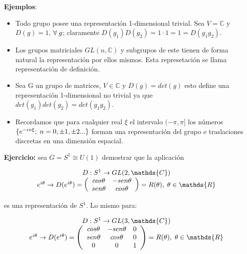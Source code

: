 \documentclass{article}
\begin{document}
\textbf{Ejemplos}:

\begin{itemize}
    \item Todo grupo posee una representación 1-dimensional trivial. Sea $V=\mathds{C}$ y $D(g)=1$, $\forall \hspace{0.1cm} g$; claramente $D(g_1)D(g_2)=1\cdot 1=1=D(g_1g_2)$.
    \item Los grupos matriciales $GL(n,\mathds{C})$ y subgrupos de este tienen de forma natural la representación por ellos mismos. Esta represetación se llama representación de definición.
    \item Sea G un grupo de matrices, $V\in \mathds{C}$ y $D(g)=det(g)$ esto define una representación 1-dimensional no trivial ya que $det(g_1)det(g_2)=det(g_1g_2)$.
    \item Recordamos que para cualquier real $\xi$ el intervalo $(-\pi, \pi]$ los números $\lbrace e^{-in\xi}; \hspace{0.1cm} n=0,\pm 1, \pm 2... \rbrace$ forman una representación del grupo e traslaciones discretas en una dimensión espacial.
\end{itemize}

 \smallskip
    \textbf{Ejercicio:} sea $G=S^1 \cong U(1)$ demostrar que la aplicación

    $$\begin{array}{cc}
         D: S^1 \to GL(2,\mathds{C})  \\
         e^{i\theta} \to D(e^{i\theta})= \left (\begin{array}{cc}
           cos \theta   & -sen \theta  \\
           sen \theta   & cos \theta
         \end{array} \right )=R( \theta), \hspace{0.1cm} \theta \in \mathds{R}
    \end{array}$$

    es una representación de $S^1$. Lo mismo para:

     $$\begin{array}{cc}
         D: S^1 \to GL(3,\mathds{C})  \\
         e^{i\theta} \to D(e^{i\theta})= \left (\begin{array}{ccc}
           cos \theta   & -sen \theta  & 0\\
           sen \theta   & cos \theta & 0 \\
           0 & 0 & 1
         \end{array} \right )=R( \theta), \hspace{0.1cm} \theta \in \mathds{R}
    \end{array}$$
\end{document}
